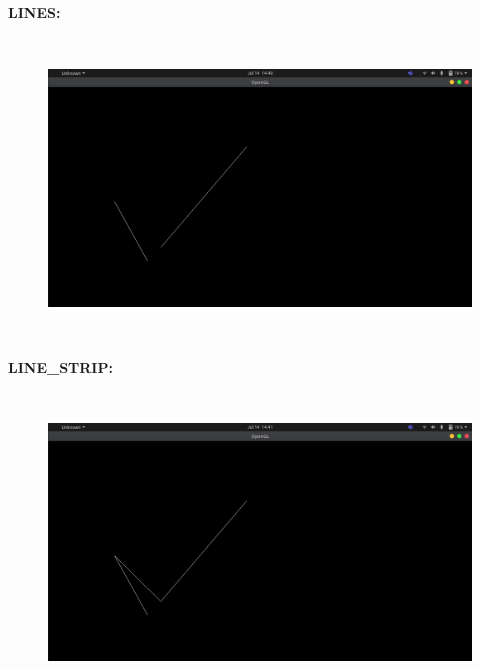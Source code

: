 \documentclass[12pt,letterpaper]{article}
\begin{document}
\newpage
\textbf{LINES:}

\textbf{}
\begin{figure}[h]
    \centering
    \includegraphics[height=8cm, keepaspectratio]{Basics/Outputs/Line.png}
\end{figure}

\newpage
\textbf{LINE\_STRIP:}

\textbf{}
\begin{figure}[h]
    \centering
    \includegraphics[height=8cm, keepaspectratio]{Basics/Outputs/Line_strip.png}
\end{figure}
\end{document}
